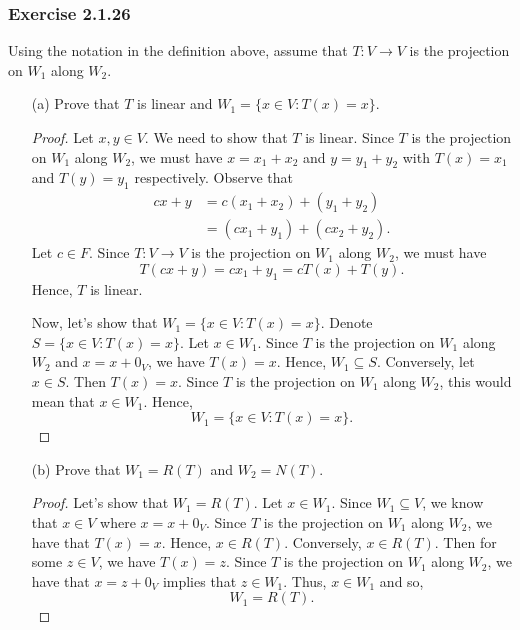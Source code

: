 \subsubsection{Exercise 2.1.26} Using the notation in the definition above, assume that \( T: V \to V  \) is the projection on \( W_{1} \) along \( W_{2} \).
\begin{enumerate}
    \item[(a)] Prove that \( T  \) is linear and \( W_{1} = \{ x \in V : T(x) = x  \}  \).
        \begin{proof}
            Let \( x,y \in V  \). We need to show that \( T  \) is linear. Since \( T  \) is the projection on \( W_{1}  \) along \( W_{2} \), we must have \( x = x_{1} + x_{2}  \) and \( y = y_{1} + y_{2} \) with \( T(x) = x_{1}  \) and \( T(y) = y_{1} \) respectively. Observe that
            \begin{align*}
                cx  + y &= c(x_{1} + x_{2}) + (y_{1} + y_{2}) \\
                        &= ( cx_{1} + y_{1} )  + (cx_{2} + y_{2}).
            \end{align*}
            Let \( c \in F  \). Since \( T: V \to V   \) is the projection on \( W_{1} \) along \( W_{2} \), we must have
            \[  T(cx+y) = cx_{1} + y_{1} = c T(x) + T(y).  \]
             Hence, \( T  \) is linear.

            Now, let's show that \( W_{1} = \{ x \in V : T(x) = x  \}  \). Denote \( S = \{ x \in V : T(x) = x  \}  \). Let \( x \in W_{1} \). Since \( T  \) is the projection on \( W_{1} \) along \( W_{2} \) and \( x = x + 0_{V} \), we have \( T(x) = x \). Hence, \( W_{1} \subseteq S   \). Conversely, let \( x \in S \). Then \( T(x)  = x  \). Since \( T  \) is the projection on \( W_{1} \) along \( W_{2} \), this would mean that \( x \in W_{1}  \). Hence, 
            \[  W_{1} = \{ x \in V : T(x) = x  \}.  \]
        \end{proof}
    \item[(b)] Prove that \( W_{1} = R(T)  \) and \( W_{2} = N(T) \).
        \begin{proof}
        Let's show that \( W_{1} = R(T) \). Let \( x \in W_{1} \). Since \( W_{1} \subseteq V  \), we know that \( x \in V  \) where \( x = x + 0_{V} \). Since \( T  \) is the projection on \( W_{1} \) along \( W_{2} \), we have that 
        \( T(x) = x  \). Hence, \( x \in R(T) \). Conversely, \( x \in R(T) \). Then for some \( z \in V  \), we have \( T(x) = z  \). Since \( T  \) is the projection on \( W_{1}  \) along \( W_{2} \), we have that \( x  = z + 0_{V} \) implies that \( z \in W_{1} \). Thus, \( x \in W_{1} \) and so, 
        \[  W_{1} = R(T). \]
      

\end{proof}
\end{enumerate}
